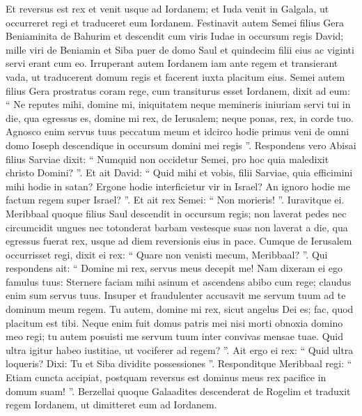 \begin{biblechapter}
\begin{biblechapter}
\begin{biblechapter}
\begin{biblechapter}
\begin{biblechapter}
\begin{biblechapter}
\begin{biblechapter}
\begin{biblechapter}
\begin{biblechapter}
\begin{biblechapter}
\begin{biblechapter}
\begin{biblechapter}
\begin{biblechapter}
\begin{biblechapter}
\begin{biblechapter}
\begin{biblechapter}
\begin{biblechapter}
\begin{biblechapter}
\begin{biblechapter}
\verse Et reversus est rex et venit usque ad Iordanem; et Iuda venit in Galgala, ut occurreret regi et traduceret eum Iordanem.
 \verse Festinavit autem Semei filius Gera Beniaminita de Bahurim et descendit cum viris Iudae in occursum regis David; 
\verse mille viri de Beniamin et Siba puer de domo Saul et quindecim filii eius ac viginti servi erant cum eo. Irruperant autem Iordanem iam ante regem 
\verse et transierant vada, ut traducerent domum regis et facerent iuxta placitum eius. Semei autem filius Gera prostratus coram rege, cum transiturus esset Iordanem, 
\verse dixit ad eum: “ Ne reputes mihi, domine mi, iniquitatem neque memineris iniuriam servi tui in die, qua egressus es, domine mi rex, de Ierusalem; neque ponas, rex, in corde tuo. 
\verse Agnosco enim servus tuus peccatum meum et idcirco hodie primus veni de omni domo Ioseph descendique in occursum domini mei regis ”. 
\verse Respondens vero Abisai filius Sarviae dixit: “ Numquid non occidetur Semei, pro hoc quia maledixit christo Domini? ”. 
\verse Et ait David: “ Quid mihi et vobis, filii Sarviae, quia efficimini mihi hodie in satan? Ergone hodie interficietur vir in Israel? An ignoro hodie me factum regem super Israel? ”. 
\verse Et ait rex Semei: “ Non morieris! ”. Iuravitque ei.
 \verse Meribbaal quoque filius Saul descendit in occursum regis; non laverat pedes nec circumcidit ungues nec totonderat barbam vestesque suas non laverat a die, qua egressus fuerat rex, usque ad diem reversionis eius in pace. 
\verse Cumque de Ierusalem occurrisset regi, dixit ei rex: “ Quare non venisti mecum, Meribbaal? ”. 
\verse Qui respondens ait: “ Domine mi rex, servus meus decepit me! Nam dixeram ei ego famulus tuus: Sternere faciam mihi asinum et ascendens abibo cum rege; claudus enim sum servus tuus. 
\verse Insuper et fraudulenter accusavit me servum tuum ad te dominum meum regem. Tu autem, domine mi rex, sicut angelus Dei es; fac, quod placitum est tibi. 
\verse Neque enim fuit domus patris mei nisi morti obnoxia domino meo regi; tu autem posuisti me servum tuum inter convivas mensae tuae. Quid ultra igitur habeo iustitiae, ut vociferer ad regem? ”. 
\verse Ait ergo ei rex: “ Quid ultra loqueris? Dixi: Tu et Siba dividite possessiones ”. 
\verse Responditque Meribbaal regi: “ Etiam cuncta accipiat, postquam reversus est dominus meus rex pacifice in domum suam! ”.
 \verse Berzellai quoque Galaadites descenderat de Rogelim et traduxit regem Iordanem, ut dimitteret eum ad Iordanem. 

\end{biblechapter}
\end{biblechapter}
\end{biblechapter}
\end{biblechapter}
\end{biblechapter}
\end{biblechapter}
\end{biblechapter}
\end{biblechapter}
\end{biblechapter}
\end{biblechapter}
\end{biblechapter}
\end{biblechapter}
\end{biblechapter}
\end{biblechapter}
\end{biblechapter}
\end{biblechapter}
\end{biblechapter}
\end{biblechapter}
\end{biblechapter}
